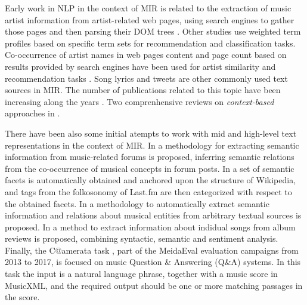 
Early work in NLP in the context of MIR is related to the extraction of music artist information from artist-related web pages, using search engines to gather those pages and then parsing their DOM trees \cite{Cohen2000}. Other studies \cite{Ellis2002} \cite{Whitman2002} use weighted term profiles based on specific term sets for recommendation and classification tasks. Co-occurrence of artist names in web pages content and page count based on results provided by search engines have been used for artist similarity and recommendation tasks \cite{Schedl2005}. Song lyrics and tweets are other commonly used text sources in MIR. The number of publications related to this topic have been increasing along the years \cite{}. Two comprenhensive reviews on \textit{context-based} approaches in \cite{Knees2013, Schedl2014}.

There have been also some initial atempts to work with mid and high-level text representations in the context of MIR. In \cite{Sordo2012} a methodology for extracting semantic information from music-related forums is proposed, inferring semantic relations from the co-occurrence of musical concepts in forum posts. In \cite{Sordo2013} a set of semantic facets is automatically obtained and anchored upon the structure of Wikipedia, and tags from the folkosonomy of Last.fm are then categorized with respect to the obtained facets. In \cite{Knees2011} a methodology to automatically extract semantic information and relations about musical entities from arbitrary textual sources is proposed. In \cite{TataandDiEugenio2010} a method to extract information about indidual songs from album reviews is proposed, combining syntactic, semantic and sentiment analysis. Finally, the C@amerata task \cite{sutcliffe2016c, sutcliffe2015}, part of the MeidaEval evaluation campaigns from 2013 to 2017, is focused on music Question & Answering (Q&A) systems. In this task the input is a natural language phrase, together with a music score in MusicXML, and the required output should be one or more matching passages in the score.

